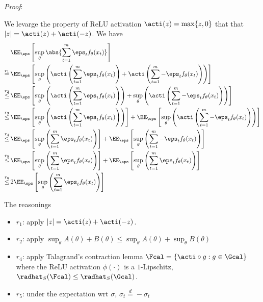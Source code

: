 \textit{Proof}:

We levarge the property of ReLU activation $\acti(z) = \max\{z,0\}$ that that $|z| = \acti(z) + \acti(-z)$. We have
\begin{align*}
  &\EE_{\eps} \left[ \sup_{\theta}\abs{\sum_{t=1}^m \eps_tf_{\theta}(x_t)} \right] \\
  \stackrel{r_1}{=}\,& \EE_{\eps} \left[ \sup_{\theta} \left( \acti\left(\sum_{t=1}^m \eps_tf_{\theta}(x_t)\right) + \acti\left(\sum_{t=1}^m -\eps_tf_{\theta}(x_t) \right) \right)  \right] \\
  \stackrel{r_2}{\le}\,& \EE_{\eps} \left[ \sup_{\theta} \left( \acti\left(\sum_{t=1}^m \eps_tf_{\theta}(x_t) \right) \right) + \sup_{\theta} \left( \acti\left(\sum_{t=1}^m -\eps_tf_{\theta}(x_t) \right) \right) \right] \\
  \stackrel{r_3}{\le}\,& \EE_{\eps} \left[ \sup_{\theta} \left( \acti\left(\sum_{t=1}^m \eps_tf_{\theta}(x_t) \right) \right) \right] + \EE_{\eps} \left[\sup_{\theta} \left( \acti\left(\sum_{t=1}^m -\eps_tf_{\theta}(x_t) \right) \right) \right] \\
  \stackrel{r_4}{\le}\,& \EE_{\eps} \left[ \sup_{\theta} \left( \sum_{t=1}^m \eps_tf_{\theta}(x_t) \right) \right] + \EE_{\eps} \left[\sup_{\theta} \left( \sum_{t=1}^m -\eps_tf_{\theta}(x_t) \right) \right] \\
  \stackrel{r_5}{\le}\,& \EE_{\eps} \left[ \sup_{\theta} \left( \sum_{t=1}^m \eps_tf_{\theta}(x_t) \right) \right] + \EE_{\eps} \left[\sup_{\theta} \left( \sum_{t=1}^m \eps_tf_{\theta}(x_t) \right) \right] \\
  \stackrel{r_6}{\le}\,& 2\EE_{\eps} \left[ \sup_{\theta} \left( \sum_{t=1}^m \eps_tf_{\theta}(x_t) \right) \right] 
\end{align*}

The reasonings
\begin{itemize}
\item $r_1$: apply $|z| = \acti(z) + \acti(-z)$.
\item $r_2$: apply $\sup_{\theta} A(\theta) + B(\theta) \le \sup_{\theta} A(\theta) + \sup_{\theta} B(\theta)$
\item $r_4$: apply Talagrand's contraction lemma $\Fcal = \{ \acti \circ g : g \in \Gcal \}$ where the ReLU activation $\phi(\cdot)$ is a $1$-Lipschitz, $\radhat_S(\Fcal) \le \radhat_S(\Gcal)$.
\item $r_5$: under the expectation wrt $\sigma$, $\sigma_t \stackrel{d}{=} -\sigma_t$
\end{itemize}

